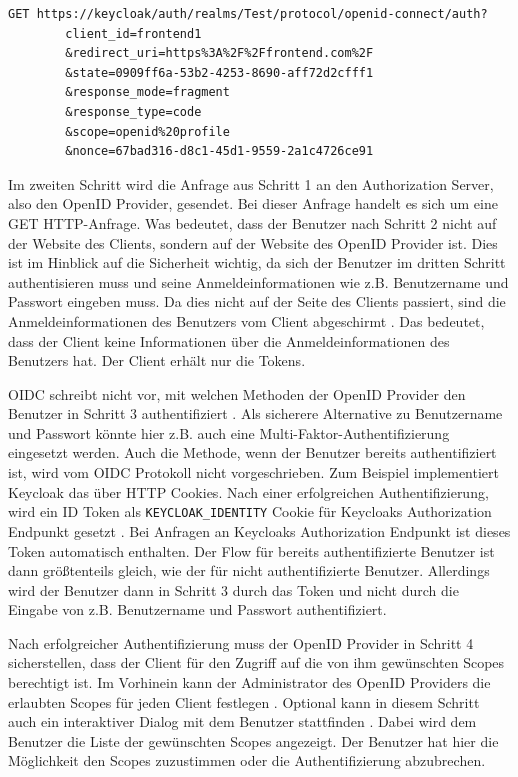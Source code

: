 \begin{lstlisting}[caption=Beispiel Authorization Request, captionpos=b, label=EBAuthorizationRequest]
GET https://keycloak/auth/realms/Test/protocol/openid-connect/auth?
        client_id=frontend1
        &redirect_uri=https%3A%2F%2Ffrontend.com%2F
        &state=0909ff6a-53b2-4253-8690-aff72d2cfff1
        &response_mode=fragment
        &response_type=code
        &scope=openid%20profile
        &nonce=67bad316-d8c1-45d1-9559-2a1c4726ce91
\end{lstlisting}

Im zweiten Schritt wird die Anfrage aus Schritt 1 an den Authorization Server, also den OpenID Provider, gesendet. Bei dieser Anfrage handelt es sich um eine GET HTTP-Anfrage. Was bedeutet, dass der Benutzer nach Schritt 2 nicht auf der Website des Clients, sondern auf der Website des OpenID Provider ist. Dies ist im Hinblick auf die Sicherheit wichtig, da sich der Benutzer im dritten Schritt authentisieren muss und seine Anmeldeinformationen wie z.B. Benutzername und Passwort eingeben muss. Da dies nicht auf der Seite des Clients passiert, sind die Anmeldeinformationen des Benutzers vom Client abgeschirmt \cite[How Does Security Work]{SSEB_keycloakDocs}. Das bedeutet, dass der Client keine Informationen über die Anmeldeinformationen des Benutzers hat. Der Client erhält nur die Tokens.

OIDC schreibt nicht vor, mit welchen Methoden der OpenID Provider den Benutzer in Schritt 3 authentifiziert \cite[Authorization Server Authenticates End-User]{EB4}. Als sicherere Alternative zu Benutzername und Passwort könnte hier z.B. auch eine Multi-Faktor-Authentifizierung eingesetzt werden. Auch die Methode, wenn der Benutzer bereits authentifiziert ist, wird vom OIDC Protokoll nicht vorgeschrieben. Zum Beispiel implementiert Keycloak das über HTTP Cookies. Nach einer erfolgreichen Authentifizierung, wird ein ID Token als \texttt{KEYCLOAK\_IDENTITY} Cookie für Keycloaks Authorization Endpunkt gesetzt \cite{EB17}. Bei Anfragen an Keycloaks Authorization Endpunkt ist dieses Token automatisch enthalten. Der Flow für bereits authentifizierte Benutzer ist dann größtenteils gleich, wie der für nicht authentifizierte Benutzer. Allerdings wird der Benutzer dann in Schritt 3 durch das Token und nicht durch die Eingabe von z.B. Benutzername und Passwort authentifiziert.

Nach erfolgreicher Authentifizierung muss der OpenID Provider in Schritt 4 sicherstellen, dass der Client für den Zugriff auf die von ihm gewünschten Scopes berechtigt ist. Im Vorhinein kann der Administrator des OpenID Providers die erlaubten Scopes für jeden Client festlegen \cite{EB68}. Optional kann in diesem Schritt auch ein interaktiver Dialog mit dem Benutzer stattfinden \cite[Authorization Server Obtains End-User Consent]{EB4}. Dabei wird dem Benutzer die Liste der gewünschten Scopes angezeigt. Der Benutzer hat hier die Möglichkeit den Scopes zuzustimmen oder die Authentifizierung abzubrechen.

